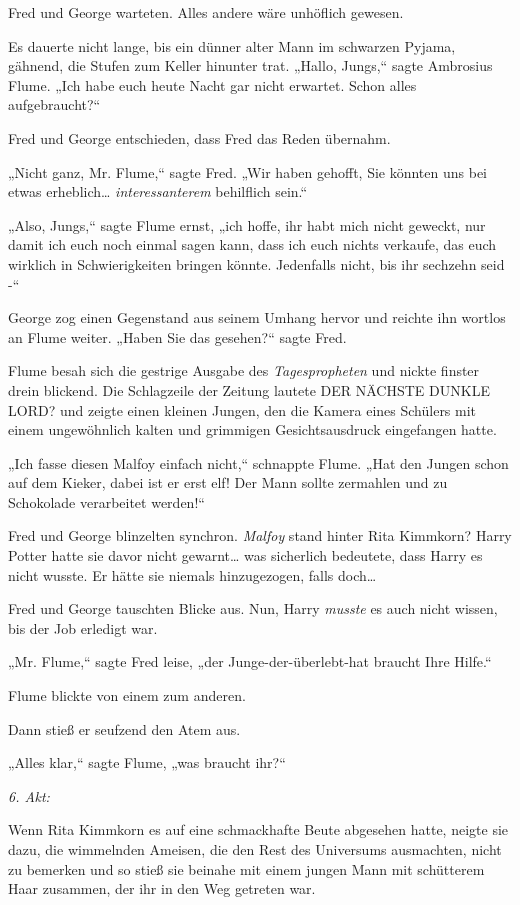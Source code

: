 {Fred und George warteten. Alles andere wäre unhöflich gewesen.

Es dauerte nicht lange, bis ein dünner alter Mann im schwarzen Pyjama, gähnend, die Stufen zum Keller hinunter trat. „Hallo, Jungs,“ sagte Ambrosius Flume. „Ich habe euch heute Nacht gar nicht erwartet. Schon alles aufgebraucht?“

Fred und George entschieden, dass Fred das Reden übernahm.

„Nicht ganz, Mr. Flume,“ sagte Fred. „Wir haben gehofft, Sie könnten uns bei etwas erheblich… \emph{interessanterem} behilflich sein.“

„Also, Jungs,“ sagte Flume ernst, „ich hoffe, ihr habt mich nicht geweckt, nur damit ich euch noch einmal sagen kann, dass ich euch nichts verkaufe, das euch wirklich in Schwierigkeiten bringen könnte. Jedenfalls nicht, bis ihr sechzehn seid -“

George zog einen Gegenstand aus seinem Umhang hervor und reichte ihn wortlos an Flume weiter. „Haben Sie das gesehen?“ sagte Fred.

Flume besah sich die gestrige Ausgabe des \emph{Tagespropheten} und nickte finster drein blickend. Die Schlagzeile der Zeitung lautete DER NÄCHSTE DUNKLE LORD? und zeigte einen kleinen Jungen, den die Kamera eines Schülers mit einem ungewöhnlich kalten und grimmigen Gesichtsausdruck eingefangen hatte.

„Ich fasse diesen Malfoy einfach nicht,“ schnappte Flume. „Hat den Jungen schon auf dem Kieker, dabei ist er erst elf! Der Mann sollte zermahlen und zu Schokolade verarbeitet werden!“

Fred und George blinzelten synchron. \emph{Malfoy} stand hinter Rita Kimmkorn? Harry Potter hatte sie davor nicht gewarnt… was sicherlich bedeutete, dass Harry es nicht wusste. Er hätte sie niemals hinzugezogen, falls doch…

Fred und George tauschten Blicke aus. Nun, Harry \emph{musste} es auch nicht wissen, bis der Job erledigt war.

„Mr. Flume,“ sagte Fred leise, „der Junge-der-überlebt-hat braucht Ihre Hilfe.“

Flume blickte von einem zum anderen.

Dann stieß er seufzend den Atem aus.

„Alles klar,“ sagte Flume, „was braucht ihr?“

\later

\emph{6. Akt:}

Wenn Rita Kimmkorn es auf eine schmackhafte Beute abgesehen hatte, neigte sie dazu, die wimmelnden Ameisen, die den Rest des Universums ausmachten, nicht zu bemerken und so stieß sie beinahe mit einem jungen Mann mit schütterem Haar zusammen, der ihr in den Weg getreten war.

}
